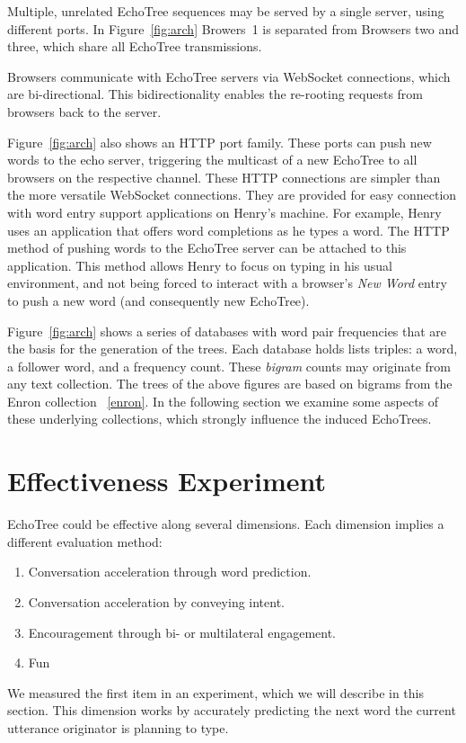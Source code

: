 \documentclass{sigchi}
\begin{document}
Multiple, unrelated EchoTree sequences may be served by a single
server, using different ports. In Figure~\ref{fig:arch}
Browers~1 is separated from Browsers two and three, which share all
EchoTree transmissions.

Browsers communicate with EchoTree servers via WebSocket connections,
which are bi-directional. This bidirectionality enables the re-rooting
requests from browsers back to the server.

Figure~\ref{fig:arch} also shows an HTTP port family. These
ports can push new words to the echo server, triggering the multicast
of a new EchoTree to all browsers on the respective channel. These
HTTP connections are simpler than the more versatile WebSocket
connections. They are provided for easy connection with word entry
support applications on Henry's machine. For example, Henry uses an
application that offers word completions as he types a word. The HTTP
method of pushing words to the EchoTree server can be attached to this
application. This method allows Henry to focus on typing in his usual
environment, and not being forced to interact with a browser's {\em
  New Word} entry to push a new word (and consequently new EchoTree).

Figure~\ref{fig:arch} shows a series of databases with word
pair frequencies that are the basis for the generation of the
trees. Each database holds lists triples: a word, a follower word, and
a frequency count. These {\em bigram} counts may originate from any
text collection. The trees of the above figures are based on bigrams
from the Enron collection ~\ref{enron}. In the following section we
examine some aspects of these underlying collections, which strongly
influence the induced EchoTrees.

\section{Effectiveness Experiment}

EchoTree could be effective along several dimensions. Each dimension
implies a different evaluation method:
\begin{enumerate}
\item Conversation acceleration through word prediction.
\item Conversation acceleration by conveying intent.
\item Encouragement through bi- or multilateral engagement.
\item Fun
\end{enumerate}
We measured the first item in an experiment, which we will describe in
this section. This dimension works by accurately predicting the next
word the current utterance originator is planning to type.
\end{document}
